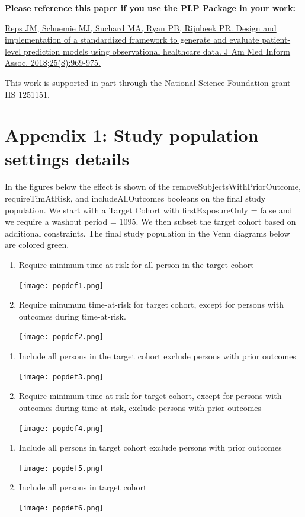 \documentclass[]{article}
\begin{document}
\textbf{Please reference this paper if you use the PLP Package in your
work:}

\href{http://dx.doi.org/10.1093/jamia/ocy032}{Reps JM, Schuemie MJ,
Suchard MA, Ryan PB, Rijnbeek PR. Design and implementation of a
standardized framework to generate and evaluate patient-level prediction
models using observational healthcare data. J Am Med Inform Assoc.
2018;25(8):969-975.}

This work is supported in part through the National Science Foundation
grant IIS 1251151.

\newpage

\section*{Appendix 1: Study population settings
details}\label{appendix-1-study-population-settings-details}

In the figures below the effect is shown of the
removeSubjectsWithPriorOutcome, requireTimAtRisk, and includeAllOutcomes
booleans on the final study population. We start with a Target Cohort
with firstExposureOnly = false and we require a washout period = 1095.
We then subset the target cohort based on additional constraints. The
final study population in the Venn diagrams below are colored green.

\begin{enumerate}
\def\labelenumi{\arabic{enumi})}
\item
  Require minimum time-at-risk for all person in the target cohort

  \texttt{[image: popdef1.png]}
\item
  Require minumum time-at-risk for target cohort, except for persons
  with outcomes during time-at-risk.

  \texttt{[image: popdef2.png]}
\end{enumerate}

\newpage

\begin{enumerate}
\def\labelenumi{\arabic{enumi})}
\setcounter{enumi}{2}
\item
  Include all persons in the target cohort exclude persons with prior
  outcomes

  \texttt{[image: popdef3.png]}
\item
  Require minimum time-at-risk for target cohort, except for persons
  with outcomes during time-at-risk, exclude persons with prior outcomes

  \texttt{[image: popdef4.png]}
\end{enumerate}

\newpage

\begin{enumerate}
\def\labelenumi{\arabic{enumi})}
\setcounter{enumi}{4}
\item
  Include all persons in target cohort exclude persons with prior
  outcomes

  \texttt{[image: popdef5.png]}
\item
  Include all persons in target cohort

  \texttt{[image: popdef6.png]}
\end{enumerate}
\end{document}
